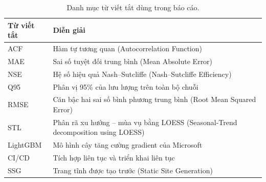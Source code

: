 \begin{table}[H]
\centering
\small
\begin{tabularx}{\linewidth}{@{}lX@{}}
\toprule
\textbf{Từ viết tắt} & \textbf{Diễn giải} \\
\midrule
ACF & Hàm tự tương quan (Autocorrelation Function) \\
MAE & Sai số tuyệt đối trung bình (Mean Absolute Error) \\
NSE & Hệ số hiệu quả Nash--Sutcliffe (Nash--Sutcliffe Efficiency) \\
Q95 & Phân vị 95\% của lưu lượng trên toàn bộ chuỗi \\
RMSE & Căn bậc hai sai số bình phương trung bình (Root Mean Squared Error) \\
STL & Phân rã xu hướng -- mùa vụ bằng LOESS (Seasonal-Trend decomposition using LOESS) \\
LightGBM & Mô hình cây tăng cường gradient của Microsoft \\
CI/CD & Tích hợp liên tục và triển khai liên tục \\
SSG & Trang tĩnh được tạo trước (Static Site Generation) \\
\bottomrule
\end{tabularx}
\caption{Danh mục từ viết tắt dùng trong báo cáo.}
\end{table}
